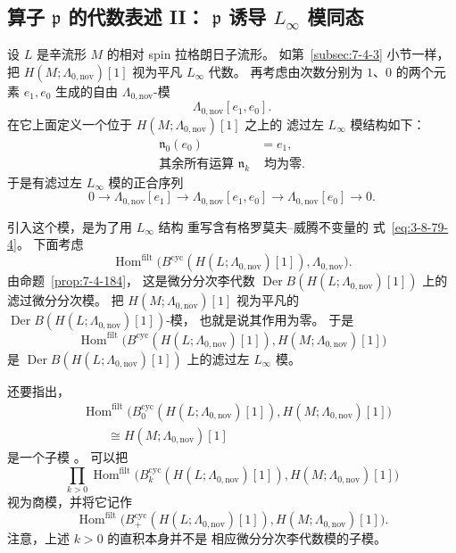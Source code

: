 
\subsection{算子 $\mathfrak p$ 的代数表述 II：
$\mathfrak p$ 诱导 $L_\infty$ 模同态}
\label{subsec:7-4-11}

设 $L$ 是辛流形 $M$ 的相对 spin 拉格朗日子流形。
如第~\ref{subsec:7-4-3} 小节一样，
把 $H(M;\Lambda_{0,\mathrm{nov}})[1]$
视为平凡 $L_\infty$ 代数。
再考虑由次数分别为 $1$、$0$ 的两个元素
$e_1,e_0$ 生成的自由 $\Lambda_{0,\mathrm{nov}}$-模
\[
\Lambda_{0,\mathrm{nov}}[e_1,e_0].
\]
在它上面定义一个位于
$H(M;\Lambda_{0,\mathrm{nov}})[1]$ 之上的
滤过左 $L_\infty$ 模结构如下：
\begin{align}
\mathfrak n_0(e_0)&=e_1,
\tag{7.4.190.1}\label{eq:7-4-190-1}\\
\text{其余所有运算 }\mathfrak n_k&\text{ 均为零}.
\tag{7.4.190.2}\label{eq:7-4-190-2}
\end{align}
于是有滤过左 $L_\infty$ 模的正合序列
\begin{equation}
0\longrightarrow
\Lambda_{0,\mathrm{nov}}[e_1]
\longrightarrow
\Lambda_{0,\mathrm{nov}}[e_1,e_0]
\longrightarrow
\Lambda_{0,\mathrm{nov}}[e_0]
\longrightarrow0.
\tag{7.4.191}\label{eq:7-4-191}
\end{equation}

引入这个模，是为了用 $L_\infty$ 结构
重写含有格罗莫夫--威腾不变量的
式~\eqref{eq:3-8-79-4}。
下面考虑
\[
\operatorname{Hom}^{\mathrm{filt}}
\bigl(
B^{\mathrm{cyc}}(H(L;\Lambda_{0,\mathrm{nov}})[1]),
\Lambda_{0,\mathrm{nov}}
\bigr).
\]
由命题~\ref{prop:7-4-184}，
这是微分分次李代数
$\operatorname{Der}B(H(L;\Lambda_{0,\mathrm{nov}})[1])$
上的滤过微分分次模。
把 $H(M;\Lambda_{0,\mathrm{nov}})[1]$
视为平凡的
$\operatorname{Der}B(H(L;\Lambda_{0,\mathrm{nov}})[1])$-模，
也就是说其作用为零。
于是
\[
\operatorname{Hom}^{\mathrm{filt}}
\bigl(
B^{\mathrm{cyc}}(H(L;\Lambda_{0,\mathrm{nov}})[1]),
H(M;\Lambda_{0,\mathrm{nov}})[1]
\bigr)
\]
是
$\operatorname{Der}B(H(L;\Lambda_{0,\mathrm{nov}})[1])$
上的滤过左 $L_\infty$ 模。

还要指出，
\[
\begin{aligned}
&\operatorname{Hom}^{\mathrm{filt}}
\bigl(
B_0^{\mathrm{cyc}}(H(L;\Lambda_{0,\mathrm{nov}})[1]),
H(M;\Lambda_{0,\mathrm{nov}})[1]
\bigr)\\
&\qquad\cong H(M;\Lambda_{0,\mathrm{nov}})[1]
\end{aligned}
\]
是一个子模
。
可以把
\[
\prod_{k>0}
\operatorname{Hom}^{\mathrm{filt}}
\bigl(
B_k^{\mathrm{cyc}}(H(L;\Lambda_{0,\mathrm{nov}})[1]),
H(M;\Lambda_{0,\mathrm{nov}})[1]
\bigr)
\]
视为商模，并将它记作
\[
\operatorname{Hom}^{\mathrm{filt}}
\bigl(
B_+^{\mathrm{cyc}}(H(L;\Lambda_{0,\mathrm{nov}})[1]),
H(M;\Lambda_{0,\mathrm{nov}})[1]
\bigr).
\]
注意，上述 $k>0$ 的直积本身并不是
相应微分分次李代数模的子模。

